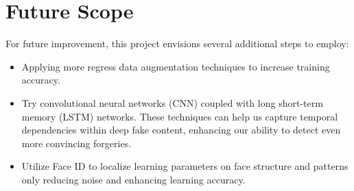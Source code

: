 \documentclass{article}
\begin{document}
\section{Future Scope}
For future improvement, this project envisions several additional steps to employ:
\begin{itemize}
    
    \item Applying more regress data augmentation techniques to increase training accuracy.
    \item Try convolutional neural networks (CNN) coupled with long short-term memory (LSTM) networks. These techniques can help us capture temporal dependencies within deep fake content, enhancing our ability to detect even more convincing forgeries.
    \item Utilize Face ID to localize learning parameters on face structure and patterns only reducing noise and enhancing learning accuracy.
\end{itemize}
\end{document}
